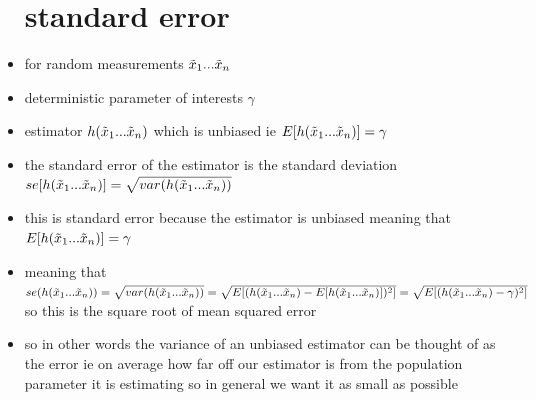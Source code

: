 \documentclass{article}
\begin{document}
\begin{itemize}
\section{standard error}
\item for random measurements $\Tilde{x}_1...\Tilde{x}_n$
\item deterministic parameter of interests $\gamma$
\item  estimator $h(\Tilde{x}_1...\Tilde{x}_n)$ which is unbiased ie $E[h(\Tilde{x}_1...\Tilde{x}_n)]=\gamma$
\item the standard error of the estimator is the standard deviation $se[h(\Tilde{x}_1...\Tilde{x}_n)]=\sqrt{var(h(\Tilde{x}_1...\Tilde{x}_n))}$
\item this is standard error because the estimator is unbiased meaning that $E[h(\Tilde{x}_1...\Tilde{x}_n)]=\gamma$
\item meaning that $se(h(\Tilde{x}_1...\Tilde{x}_n))=\sqrt{var(h(\Tilde{x}_1...\Tilde{x}_n))}=\sqrt{E[(h(\Tilde{x}_1...\Tilde{x}_n)-E[h(\Tilde{x}_1...\Tilde{x}_n)])^2]}=\sqrt{E[(h(\Tilde{x}_1...\Tilde{x}_n)-\gamma)^2]}$ so this is the square root of mean squared error
\item so in other words the variance of an unbiased estimator can be thought of as the error ie on average how far off our estimator is from the population parameter it is estimating so in general we want it as small as possible

\end{itemize}
\end{document}
